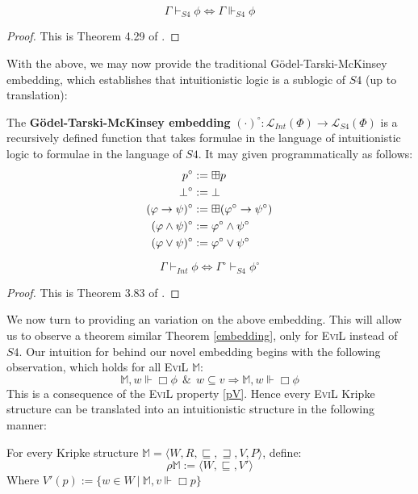 \begin{theorem}
\[ \Gamma \vdash_{S4} \phi \iff \Gamma \Vdash_{S4} \phi \]
\end{theorem}
\begin{proof}
This is Theorem 4.29 of \cite[chapter 4.3, pg. 205]{blackburn_modal_2001}.
\end{proof}

With the above, we may now provide the traditional
G\"{o}del-Tarski-McKinsey embedding, which establishes that
intuitionistic logic is a sublogic of $S4$ (up to translation):

\begin{mydef}
The  \textbf{G\"{o}del-Tarski-McKinsey embedding} $(\cdot)^\circ :
\mathcal{L}_{Int}(\Phi) \to \mathcal{L}_{S4}(\Phi)$ is a recursively
defined function that takes formulae in the language of intuitionistic
logic to formulae in the language of $S4$.  It may given
programmatically as follows: 
\begin{align*}
  p^\circ & := \boxplus p \\
  \bot^\circ & := \bot \\
  (\varphi \to \psi)^\circ & := \boxplus(\varphi^\circ \to \psi^\circ) \\
  (\varphi \wedge \psi)^\circ & := \varphi^\circ \wedge \psi^\circ \\
  (\varphi \vee \psi)^\circ & := \varphi^\circ \vee \psi^\circ 
\end{align*}
\end{mydef}

\begin{theorem}\label{embedding}
\[ \Gamma \vdash_{Int} \phi \iff \Gamma^\circ \vdash_{S4} \phi^\circ \]
\end{theorem}
\begin{proof}
  This is Theorem 3.83 of \cite[chapter 3, pg. 97]{chagrov_modal_1997}.
\end{proof}

We now turn to providing an variation on the above
embedding.  This will allow us to observe a theorem similar Theorem
\ref{embedding}, only for
\textsc{EviL} instead of $S4$.  Our intuition for behind our novel
embedding begins with the 
following observation, which holds for all \textsc{EviL} $\mathbb{M}$:
\[ \mathbb{M},w \Vdash \Box \phi\ \  \&\ \ w \subseteq v
\Longrightarrow \mathbb{M},w \Vdash \Box \phi \]
This is a consequence of the \textsc{EviL} property \ref{pV}.  Hence every \textsc{EviL} Kripke structure can be translated into an
intuitionistic structure in the following manner:
\begin{definition}
For every Kripke structure $\mathbb{M} = \langle W, R, \sqsubseteq,
\sqsupseteq, V, P \rangle$, define:
\[ \rho\mathbb{M} := \langle W, \sqsubseteq, V'\rangle\]
Where $V'(p) := \{ w \in W\ |\ \mathbb{M},v \Vdash \Box p\}$
\end{definition}

